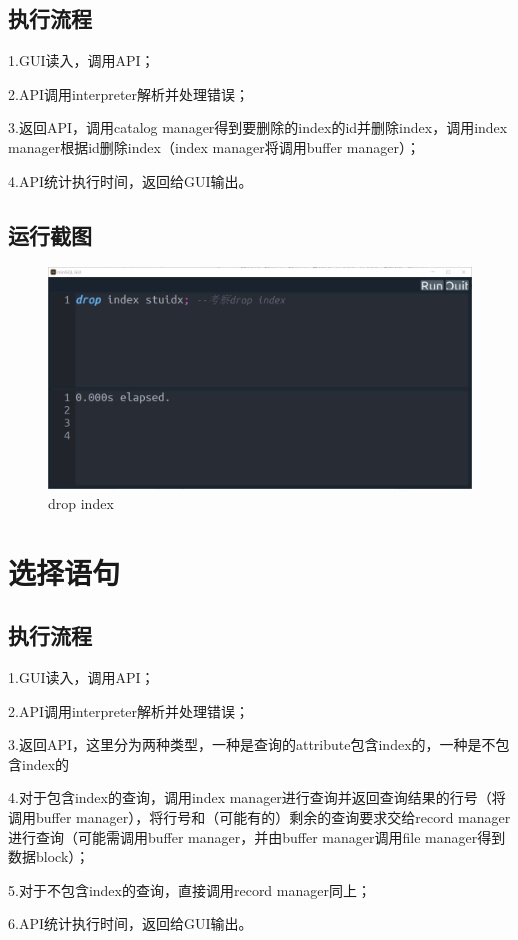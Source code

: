 \documentclass[UTF8]{ctexrep} %
\begin{document}
\subsection{执行流程}
1.GUI读入，调用API；
\par
2.API调用interpreter解析并处理错误；
\par
3.返回API，调用catalog manager得到要删除的index的id并删除index，调用index manager根据id删除index（index manager将调用buffer manager）；
\par
4.API统计执行时间，返回给GUI输出。
\subsection{运行截图}
\begin{figure}[H]
    \centering
    \includegraphics[width=0.8\linewidth]{figure/4.1.png}
    \caption{drop index}
    \label{fig:runtime4.1}
\end{figure}
\section{选择语句}
\subsection{执行流程}
1.GUI读入，调用API；
\par
2.API调用interpreter解析并处理错误；
\par
3.返回API，这里分为两种类型，一种是查询的attribute包含index的，一种是不包含index的
\par
4.对于包含index的查询，调用index manager进行查询并返回查询结果的行号（将调用buffer manager），将行号和（可能有的）剩余的查询要求交给record manager进行查询（可能需调用buffer manager，并由buffer manager调用file manager得到数据block）；
\par
5.对于不包含index的查询，直接调用record manager同上；
\par
6.API统计执行时间，返回给GUI输出。
\end{document}
